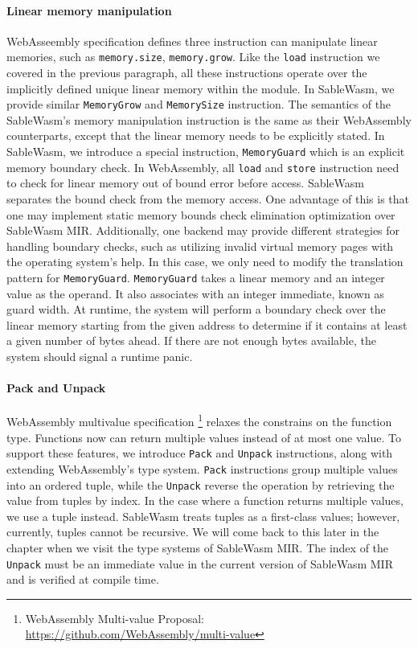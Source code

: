 \paragraph{Linear memory manipulation}
WebAsseembly specification defines three instruction can manipulate linear memories, such as \texttt{memory.size}, \texttt{memory.grow}. Like the \texttt{load} instruction we covered in the previous paragraph, all these instructions operate over the implicitly defined unique linear memory within the module. In SableWasm, we provide similar \texttt{MemoryGrow} and \texttt{MemorySize} instruction. The semantics of the SableWasm's memory manipulation instruction is the same as their WebAssembly counterparts, except that the linear memory needs to be explicitly stated. In SableWasm, we introduce a special instruction, \texttt{MemoryGuard} which is an explicit memory boundary check. In WebAssembly, all \texttt{load} and \texttt{store} instruction need to check for linear memory out of bound error before access. SableWasm separates the bound check from the memory access. One advantage of this is that one may implement static memory bounds check elimination optimization over SableWasm MIR. Additionally, one backend may provide different strategies for handling boundary checks, such as utilizing invalid virtual memory pages with the operating system's help. In this case, we only need to modify the translation pattern for \texttt{MemoryGuard}. \texttt{MemoryGuard} takes a linear memory and an integer value as the operand. It also associates with an integer immediate, known as guard width. At runtime, the system will perform a boundary check over the linear memory starting from the given address to determine if it contains at least a given number of bytes ahead. If there are not enough bytes available, the system should signal a runtime panic.

\paragraph{Pack and Unpack}
WebAssembly multivalue specification \footnote{WebAssembly Multi-value Proposal: \url{https://github.com/WebAssembly/multi-value}} relaxes the constrains on the function type. Functions now can return multiple values instead of at most one value. To support these features, we introduce \texttt{Pack} and \texttt{Unpack} instructions, along with extending WebAssembly's type system. \texttt{Pack} instructions group multiple values into an ordered tuple, while the \texttt{Unpack} reverse the operation by retrieving the value from tuples by index. In the case where a function returns multiple values, we use a tuple instead. SableWasm treats tuples as a first-class values; however, currently, tuples cannot be recursive. We will come back to this later in the chapter when we visit the type systems of SableWasm MIR. The index of the \texttt{Unpack} must be an immediate value in the current version of SableWasm MIR and is verified at compile time.

